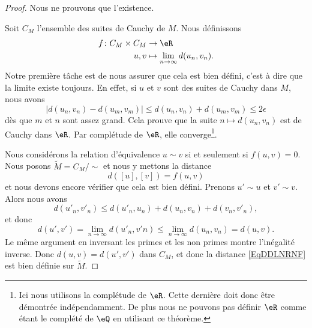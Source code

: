\begin{proof}
    Nous ne prouvons que l'existence.

    Soit \( C_M\) l'ensemble des suites de Cauchy de \( M\). Nous définissons
    \begin{equation}
        \begin{aligned}
            f\colon C_M\times C_M&\to \eR \\
            u,v&\mapsto \lim_{n\to \infty} d(u_n,v_n).
        \end{aligned}
    \end{equation}
    Notre première tâche est de nous assurer que cela est bien défini, c'est à dire que la limite existe toujours. En effet, si \( u\) et \( v\) sont des suites de Cauchy dans \( M\), nous avons
    \begin{equation}
        \left| d(u_n,v_n)-d(u_m,v_m) \right| \leq d(u_n,v_n)+d(u_m,v_m)\leq 2\epsilon
    \end{equation}
    dès que \( m\) et \( n\) sont assez grand. Cela prouve que la suite \( n\mapsto d(u_n,v_n)\) est de Cauchy dans \( \eR\). Par complétude de \( \eR\), elle converge\footnote{Ici nous utilisons la complétude de \( \eR\). Cette dernière doit donc être démontrée indépendamment. De plus nous ne pouvons pas définir \( \eR\) comme étant le complété de \( \eQ\) en utilisant ce théorème.}.

    Nous considérons la relation d'équivalence \( u\sim v\) si et seulement si \( f(u,v)=0\). Nous posons \( \tilde M=C_M/\sim\) et nous y mettons la distance
    \begin{equation}    \label{EqDDLNRNF}
        d( [u],[v]  )=f(u,v)
    \end{equation}
    et nous devons encore vérifier que cela est bien défini. Prenons \( u'\sim u\) et \( v'\sim v\). Alors nous avons
    \begin{equation}
        d(u'_n,v'_n)\leq d(u'_n,u_n)+d(u_n,v_n)+d(v_n,v'_n),
    \end{equation}
    et donc
    \begin{equation}
        d(u',v')=\lim_{n\to \infty} d(u'_n,v'n)\leq \lim_{n\to \infty} d(u_n,v_n)=d(u,v).
    \end{equation}
    Le même argument en inversant les primes et les non primes montre l'inégalité inverse. Donc \( d(u,v)=d(u',v')\) dans \( C_M\), et donc la distance \eqref{EqDDLNRNF} est bien définie sur \( \tilde M\).


\end{proof}
